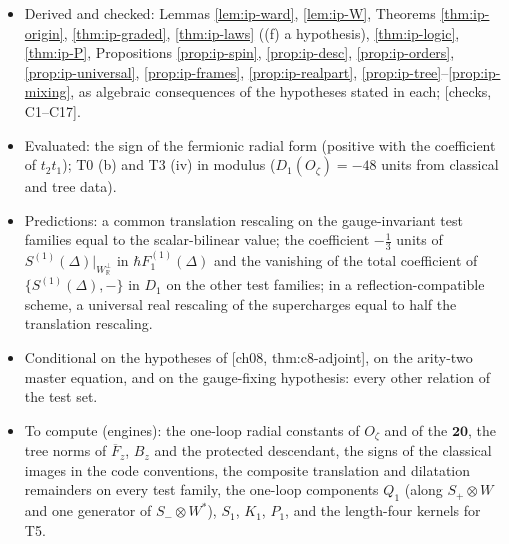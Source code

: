 \documentclass[11pt]{report}
\theoremstyle{plain}
\theoremstyle{definition}
\numberwithin{equation}{chapter}
\newcommand{\Wp}{W_{\mathbb R}^\perp}
\begin{document}
\begin{itemize}
\item Derived and checked: Lemmas \ref{lem:ip-ward}, \ref{lem:ip-W}, Theorems \ref{thm:ip-origin}, \ref{thm:ip-graded}, \ref{thm:ip-laws} ((f) a hypothesis), \ref{thm:ip-logic}, \ref{thm:ip-P}, Propositions \ref{prop:ip-spin}, \ref{prop:ip-desc}, \ref{prop:ip-orders}, \ref{prop:ip-universal}, \ref{prop:ip-frames}, \ref{prop:ip-realpart}, \ref{prop:ip-tree}--\ref{prop:ip-mixing}, as algebraic consequences of the hypotheses stated in each; [checks, C1--C17].
\item Evaluated: the sign of the fermionic radial form (positive with the coefficient of $t_2t_1$); T0 (b) and T3 (iv) in modulus ($D_1(O_\zeta)=-48$ units from classical and tree data).
\item Predictions: a common translation rescaling on the gauge-invariant test families equal to the scalar-bilinear value; the coefficient $-\tfrac13$ units of $S^{(1)}(\Delta)|_{\Wp}$ in $\hbar F_1^{(1)}(\Delta)$ and the vanishing of the total coefficient of $\{S^{(1)}(\Delta),-\}$ in $D_1$ on the other test families; in a reflection-compatible scheme, a universal real rescaling of the supercharges equal to half the translation rescaling.
\item Conditional on the hypotheses of [ch08, thm:c8-adjoint], on the arity-two master equation, and on the gauge-fixing hypothesis: every other relation of the test set.
\item To compute (engines): the one-loop radial constants of $O_\zeta$ and of the $\mathbf{20}$, the tree norms of $\overline F_z$, $B_z$ and the protected descendant, the signs of the classical images in the code conventions, the composite translation and dilatation remainders on every test family, the one-loop components $Q_1$ (along $S_+\otimes W$ and one generator of $S_-\otimes W^*$), $S_1$, $K_1$, $P_1$, and the length-four kernels for T5.
\end{itemize}
\end{document}
